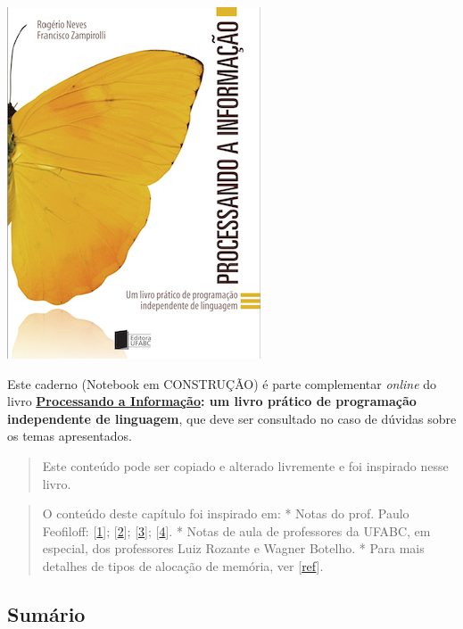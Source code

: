 \documentclass[12pt,a4paper]{article}
\begin{document}
    \includegraphics{"figs/Capa_Processando_Informacao.jpg"}

Este caderno (Notebook em CONSTRUÇÃO) é parte complementar \emph{online}
do livro
\textbf{\href{https://editora.ufabc.edu.br/matematica-e-ciencias-da-computacao/58-processando-a-informacao}{Processando
a Informação}: um livro prático de programação independente de
linguagem}, que deve ser consultado no caso de dúvidas sobre os temas
apresentados.

\begin{quote}
Este conteúdo pode ser copiado e alterado livremente e foi inspirado
nesse livro.
\end{quote}

\begin{quote}
O conteúdo deste capítulo foi inspirado em: * Notas do prof. Paulo
Feofiloff:
{[}\href{https://www.ime.usp.br/~pf/algoritmos/aulas/pont.html}{1}{]};
{[}\href{https://www.ime.usp.br/~pf/algoritmos/aulas/aloca.html}{2}{]};
{[}\href{https://www.ime.usp.br/~pf/algoritmos/aulas/lista.html}{3}{]};
{[}\href{https://www.ime.usp.br/~pf/algoritmos/aulas/fila.html}{4}{]}. *
Notas de aula de professores da UFABC, em especial, dos professores Luiz
Rozante e Wagner Botelho. * Para mais detalhes de tipos de alocação de
memória, ver
{[}\href{https://www.inf.ufpr.br/roberto/ci067/10_aloc.html}{ref}{]}.
\end{quote}

    \hypertarget{sumuxe1rio}{%
\subsection{Sumário}\label{sumuxe1rio}}
\end{document}
